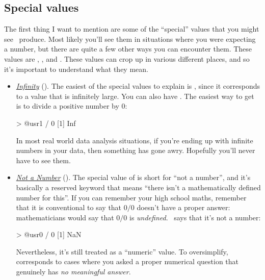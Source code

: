 \subsection{Special values\label{sec:specials}}

The first thing I want to mention are some of the ``special'' values that you might see \R\ produce. Most likely you'll see them in situations where you were expecting a number, but there are quite a few other ways you can encounter them. These values are , ,  and . These values can crop up in various different places, and so it's important to understand what they mean. 

\begin{itemize}

\item \underline{\it Infinity} (). The easiest of the special values to explain is , since it corresponds to a value that is infinitely large. You can also have . The easiest way to get  is to divide a positive number by 0:
\begin{rblock1}
> @usr{1 / 0}
[1] Inf
\end{rblock1}
In most real world data analysis situations, if you're ending up with infinite numbers in your data, then something has gone awry. Hopefully you'll never have to see them.
\vspace*{6pt}

\item \underline{\it Not a Number} (). The special value of  is short for ``not a number'', and it's basically a reserved keyword that means ``there isn't a mathematically defined number for this''. If you can remember your high school maths, remember that it is conventional to say that $0/0$ doesn't have a proper answer: mathematicians would say that $0/0$ is {\it undefined}. \R\ says that it's not a number:
\begin{rblock1}
> @usr{0 / 0}
[1] NaN
\end{rblock1}
Nevertheless, it's still treated as a ``numeric'' value. To oversimplify,  corresponds to cases where you asked a proper numerical question that genuinely has {\it no meaningful answer}. 
\vspace*{6pt}



\end{itemize}
